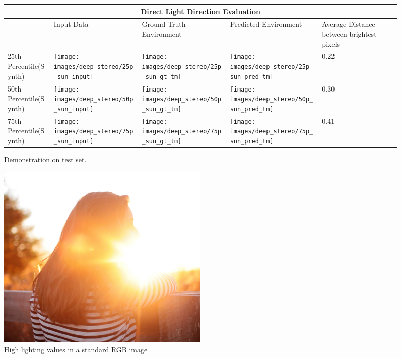 \documentclass[ %
                    author={Gavin Parker},
                supervisor={Dr. Neill Campbell},
                    degree={MEng},
                     title={Deep Siamese Networks for Illumination Estimation from Stereo Images},
                  subtitle={},
                      type={research},
                      year={2018} ]{dissertation}
\begin{document}
\begin{figure}
\centering
\begin{tabular}{ |p{3cm}||p{3cm}|p{3cm}|p{3cm}|p{3cm}|  }
 \hline
 \multicolumn{5}{|c|}{Direct Light Direction Evaluation} \\
 \hline
  & Input Data &Ground Truth Environment&Predicted Environment&Average Distance between brightest pixels\\
 \hline
 25th Percentile(Synth)&\parbox[c]{1em}{
 \texttt{[image: images/deep\_stereo/25p\_sun\_input]}}&\parbox[c]{1em}{\texttt{[image: images/deep\_stereo/25p\_sun\_gt\_tm]}}&
\parbox[c]{1em}{\texttt{[image: images/deep\_stereo/25p\_sun\_pred\_tm]}}& 0.22\\
 50th Percentile(Synth)&\parbox[c]{1em}{
 \texttt{[image: images/deep\_stereo/50p\_sun\_input]}}&\parbox[c]{1em}{\texttt{[image: images/deep\_stereo/50p\_sun\_gt\_tm]}}&
\parbox[c]{1em}{\texttt{[image: images/deep\_stereo/50p\_sun\_pred\_tm]}}& 0.30\\
 75th Percentile(Synth)&\parbox[c]{1em}{
 \texttt{[image: images/deep\_stereo/75p\_sun\_input]}}&\parbox[c]{1em}{\texttt{[image: images/deep\_stereo/75p\_sun\_gt\_tm]}}&
\parbox[c]{1em}{\texttt{[image: images/deep\_stereo/75p\_sun\_pred\_tm]}}& 0.41\\
 \hline
\end{tabular}

\label{mse_results}
\caption{Demonstration on test set.}

\end{figure}
\begin{figure}[h]
\centering
\includegraphics[width=0.5\textwidth]{exposure_example}
\caption{High lighting values in a standard RGB image}
\label{rgb_example}
\end{figure}
\end{document}
